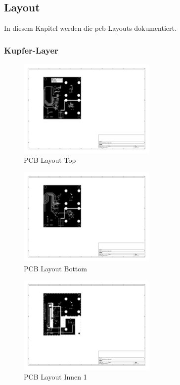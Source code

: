 \pagebreak

\subsection{Layout}\label{sec:layout}

In diesem Kapitel werden die \acrshort{pcb}-Layouts dokumentiert.

\subsubsection{Kupfer-Layer}

\begin{figure}[H]
    \centering
    \includegraphics[trim=130 220 450 80, clip, width=0.6\textwidth]{attachments/pcb_F_Cu.pdf}
    \caption{PCB Layout Top}\label{fig:pcb_f_cu}
\end{figure}

\begin{figure}[H]
    \centering
    \includegraphics[trim=130 220 450 80, clip, width=0.6\textwidth]{attachments/pcb_B_Cu.pdf}
    \caption{PCB Layout Bottom}\label{fig:pcb_b_cu}
\end{figure}

\begin{figure}[H]
    \centering
    \includegraphics[trim=130 220 450 80, clip, width=0.6\textwidth]{attachments/pcb_In1_Cu.pdf}
    \caption{PCB Layout Innen 1}\label{fig:pcb_in1_cu}
\end{figure}

